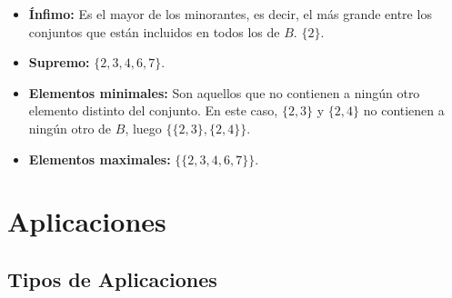 \documentclass[a4paper,12pt]{article}
\begin{document}
\begin{ejercicio}[title=Ejercicio 18]
\begin{itemize}
    \item \textbf{Ínfimo:}  
    Es el mayor de los minorantes, es decir, el más grande entre los conjuntos que están incluidos en todos los de $B$.  
    \(\boxed{\{2\}}\).

    \item \textbf{Supremo:}  
    \(\boxed{\{2,3,4,6,7\}}\).

    \item \textbf{Elementos minimales:}  
    Son aquellos que no contienen a ningún otro elemento distinto del conjunto.  
    En este caso, \(\{2,3\}\) y \(\{2,4\}\) no contienen a ningún otro de $B$, luego  
    \(\boxed{\{\{2,3\}, \{2,4\}\}}\).

    \item \textbf{Elementos maximales:}  
    \(\boxed{\{\{2,3,4,6,7\}\}}\).
\end{itemize}

\end{ejercicio}

\section{Aplicaciones}

\subsection{Tipos de Aplicaciones}
\end{document}
